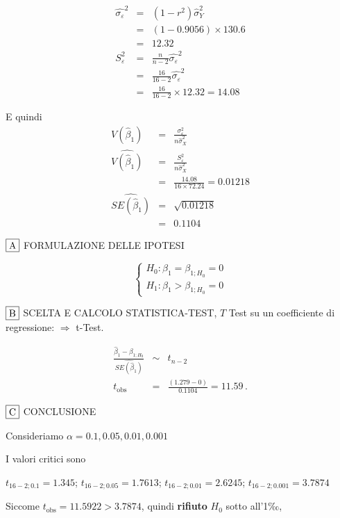 \documentclass[
  11pt,
]{book}
\theoremstyle{mytheoremstyle}
\theoremstyle{mydefstyle}
\newenvironment{sol}
  {
  \begin{tcolorbox}[enhanced,breakable,arc=0.1mm,boxrule=1pt,colback=white,colframe=iblue,
  title=\bf \fontfamily{lmss}\selectfont \hspace{.5 cm} Soluzione,drop fuzzy shadow]

}{
\end{tcolorbox}
  }
\begin{document}
\begin{sol}
\begin{eqnarray*}
\hat{\sigma_\varepsilon}^2&=&(1-r^2)\hat\sigma_Y^2\\
&=& (1- 0.9056 )\times 130.6 \\
   &=&  12.32 \\
   S_\varepsilon^2 &=& \frac{n} {n-2} \hat{\sigma_\varepsilon}^2\\
   &=&  \frac{ 16 } { 16 -2} \hat{\sigma_\varepsilon}^2 \\
 &=&  \frac{ 16 } { 16 -2} \times  12.32  =  14.08  
\end{eqnarray*}

E quindi\begin{eqnarray*}
V(\hat\beta_{1}) &=& \frac{\sigma_{\varepsilon}^{2}} {n \hat{\sigma}^{2}_{X}} \\
\widehat{V(\hat\beta_{1})} &=& \frac{S_{\varepsilon}^{2}} {n \hat{\sigma}^{2}_{X}} \\
 &=& \frac{ 14.08 } { 16 \times  72.24 } =  0.01218 \\
 \widehat{SE(\hat\beta_{1})}        &=&  \sqrt{ 0.01218 }\\
 &=&  0.1104 
\end{eqnarray*}

\(\fbox{A}\) FORMULAZIONE DELLE IPOTESI

\[\begin{cases}
   H_0: \beta_1 = \beta_{1;H_0}=0 \\
   H_1: \beta_1 > \beta_{1;H_0}=0 
   \end{cases}\]

\(\fbox{B}\) SCELTA E CALCOLO STATISTICA-TEST, \(T\)
Test su un coefficiente di regressione: \(\Rightarrow\) t-Test.

\begin{eqnarray*}
 \frac{\hat\beta_{ 1 } - \beta_{ 1 ;H_0}} {\widehat{SE(\hat\beta_{ 1 })}}&\sim&t_{n-2}\\
   t_{\text{obs}}
&=& \frac{ ( 1.279 -  0 )} { 0.1104 }
 =   11.59 \, .
\end{eqnarray*}

\(\fbox{C}\) CONCLUSIONE

Consideriamo \(\alpha=0.1, 0.05, 0.01, 0.001\)

I valori critici sono

\(t_{16-2;0.1}=1.345\); \(t_{16-2;0.05}=1.7613\); \(t_{16-2;0.01}=2.6245\); \(t_{16-2;0.001}=3.7874\)

Siccome \(t_\text{obs}=11.5922>3.7874\), quindi \textbf{rifiuto} \(H_0\) sotto all'1‰,


\end{sol}
\end{document}

